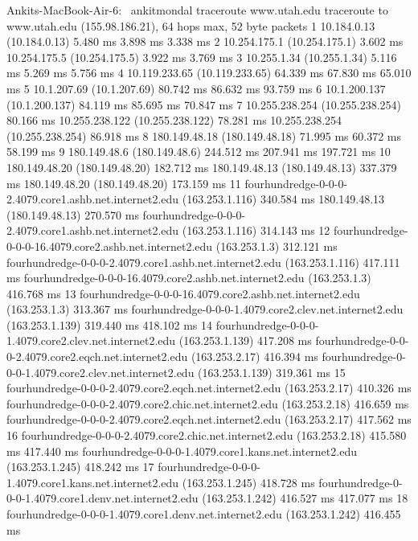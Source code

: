 \documentclass{article}
\begin{document}
\begin{enumerate}[a.]
\begin{code}
Ankits-MacBook-Air-6:~ ankitmondal traceroute www.utah.edu
traceroute to www.utah.edu (155.98.186.21), 64 hops max, 52 byte packets
 1  10.184.0.13 (10.184.0.13)  5.480 ms  3.898 ms  3.338 ms
 2  10.254.175.1 (10.254.175.1)  3.602 ms
    10.254.175.5 (10.254.175.5)  3.922 ms  3.769 ms
 3  10.255.1.34 (10.255.1.34)  5.116 ms  5.269 ms  5.756 ms
 4  10.119.233.65 (10.119.233.65)  64.339 ms  67.830 ms  65.010 ms
 5  10.1.207.69 (10.1.207.69)  80.742 ms  86.632 ms  93.759 ms
 6  10.1.200.137 (10.1.200.137)  84.119 ms  85.695 ms  70.847 ms
 7  10.255.238.254 (10.255.238.254)  80.166 ms
    10.255.238.122 (10.255.238.122)  78.281 ms
    10.255.238.254 (10.255.238.254)  86.918 ms
 8  180.149.48.18 (180.149.48.18)  71.995 ms  60.372 ms  58.199 ms
 9  180.149.48.6 (180.149.48.6)  244.512 ms  207.941 ms  197.721 ms
10  180.149.48.20 (180.149.48.20)  182.712 ms
    180.149.48.13 (180.149.48.13)  337.379 ms
    180.149.48.20 (180.149.48.20)  173.159 ms
11  fourhundredge-0-0-0-2.4079.core1.ashb.net.internet2.edu (163.253.1.116)  340.584 ms
    180.149.48.13 (180.149.48.13)  270.570 ms
    fourhundredge-0-0-0-2.4079.core1.ashb.net.internet2.edu (163.253.1.116)  314.143 ms
12  fourhundredge-0-0-0-16.4079.core2.ashb.net.internet2.edu (163.253.1.3)  312.121 ms
    fourhundredge-0-0-0-2.4079.core1.ashb.net.internet2.edu (163.253.1.116)  417.111 ms
    fourhundredge-0-0-0-16.4079.core2.ashb.net.internet2.edu (163.253.1.3)  416.768 ms
13  fourhundredge-0-0-0-16.4079.core2.ashb.net.internet2.edu (163.253.1.3)  313.367 ms
    fourhundredge-0-0-0-1.4079.core2.clev.net.internet2.edu (163.253.1.139)  319.440 ms  418.102 ms
14  fourhundredge-0-0-0-1.4079.core2.clev.net.internet2.edu (163.253.1.139)  417.208 ms
    fourhundredge-0-0-0-2.4079.core2.eqch.net.internet2.edu (163.253.2.17)  416.394 ms
    fourhundredge-0-0-0-1.4079.core2.clev.net.internet2.edu (163.253.1.139)  319.361 ms
15  fourhundredge-0-0-0-2.4079.core2.eqch.net.internet2.edu (163.253.2.17)  410.326 ms
    fourhundredge-0-0-0-2.4079.core2.chic.net.internet2.edu (163.253.2.18)  416.659 ms
    fourhundredge-0-0-0-2.4079.core2.eqch.net.internet2.edu (163.253.2.17)  417.562 ms
16  fourhundredge-0-0-0-2.4079.core2.chic.net.internet2.edu (163.253.2.18)  415.580 ms  417.440 ms
    fourhundredge-0-0-0-1.4079.core1.kans.net.internet2.edu (163.253.1.245)  418.242 ms
17  fourhundredge-0-0-0-1.4079.core1.kans.net.internet2.edu (163.253.1.245)  418.728 ms
    fourhundredge-0-0-0-1.4079.core1.denv.net.internet2.edu (163.253.1.242)  416.527 ms  417.077 ms
18  fourhundredge-0-0-0-1.4079.core1.denv.net.internet2.edu (163.253.1.242)  416.455 ms

\end{code}
\end{enumerate}
\end{document}
